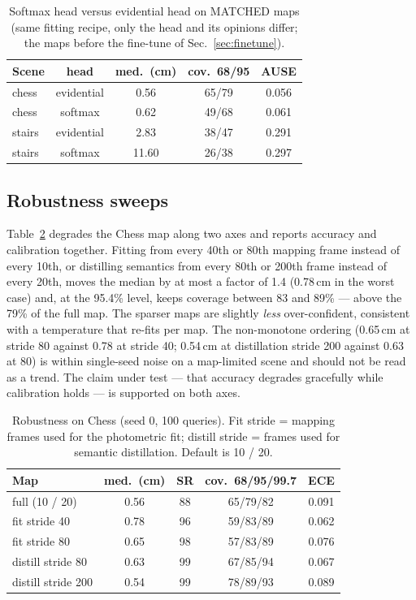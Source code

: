 \documentclass[journal]{IEEEtran}
\begin{document}
\begin{table}[t]
\caption{Softmax head versus evidential head on MATCHED maps (same fitting recipe, only the head and its opinions differ; the maps before the fine-tune of Sec.~\ref{sec:finetune}).}
\label{tab:softmaxfair}
\centering\footnotesize
\begin{tabular}{@{}lcccc@{}}
\toprule
Scene & head & med.\ (cm) & cov.\ 68/95 & AUSE \\
\midrule
chess  & evidential & 0.56 & 65/79 & 0.056 \\
chess  & softmax    & 0.62 & 49/68 & 0.061 \\
stairs & evidential & 2.83 & 38/47 & 0.291 \\
stairs & softmax    & 11.60 & 26/38 & 0.297 \\
\bottomrule
\end{tabular}
\end{table}

\subsection{Robustness sweeps}
\label{sec:robust}
Table~\ref{tab:robust} degrades the Chess map along two axes and reports
accuracy and calibration together. Fitting from every 40th or 80th mapping
frame instead of every 10th, or distilling semantics from every 80th or
200th frame instead of every 20th, moves the median by at most a factor of
1.4 (0.78\,cm in the worst case) and, at the 95.4\% level, keeps coverage
between 83 and 89\% --- above the 79\% of the full map. The sparser maps
are slightly \emph{less} over-confident, consistent with a temperature that
re-fits per map. The non-monotone ordering (0.65\,cm at stride 80 against 0.78 at stride 40; 0.54\,cm at distillation stride 200 against 0.63 at 80)
is within single-seed noise on a map-limited scene and should not be read as
a trend. The claim under test --- that accuracy degrades gracefully while
calibration holds --- is supported on both axes.

\begin{table}[t]
\caption{Robustness on Chess (seed 0, 100 queries). Fit stride = mapping
frames used for the photometric fit; distill stride = frames used for
semantic distillation. Default is 10 / 20.}
\label{tab:robust}
\centering\footnotesize
\setlength{\tabcolsep}{4pt}
\begin{tabular}{@{}lcccc@{}}
\toprule
Map & med.\ (cm) & SR & cov.\ 68/95/99.7 & ECE \\
\midrule
full (10 / 20)      & 0.56 & 88 & 65/79/82 & 0.091 \\
fit stride 40       & 0.78 & 96 & 59/83/89 & 0.062 \\
fit stride 80       & 0.65 & 98 & 57/83/89 & 0.076 \\
distill stride 80   & 0.63 & 99 & 67/85/94 & 0.067 \\
distill stride 200  & 0.54 & 99 & 78/89/93 & 0.089 \\
\bottomrule
\end{tabular}
\end{table}
\end{document}
